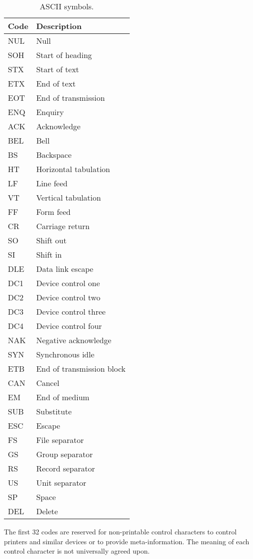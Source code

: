 \documentclass[fsharpnotes.tex]{subfiles}
\begin{document}
\begin{table}
  \centering
  \begin{tabular}{|l|l|}
    \hline
    \rowcolor{headerRowColor} Code & Description\\
    \hline
    NUL & Null\\
    SOH & Start of heading\\
    STX & Start of text\\
    ETX & End of text\\
    EOT & End of transmission\\
    ENQ & Enquiry\\
    ACK & Acknowledge\\
    BEL & Bell\\
    BS & Backspace\\
    HT & Horizontal tabulation\\
    LF & Line feed\\
    VT & Vertical tabulation\\
    FF & Form feed\\
    CR & Carriage return\\
    SO & Shift out\\
    SI & Shift in\\
    DLE & Data link escape\\
    DC1 & Device control one\\
    DC2 & Device control two\\
    DC3 & Device control three\\
    DC4 & Device control four\\
    NAK & Negative acknowledge\\
    SYN & Synchronous idle\\
    ETB & End of transmission block\\
    CAN & Cancel\\
    EM & End of medium\\
    SUB & Substitute\\
    ESC & Escape\\
    FS & File separator\\
    GS & Group separator\\
    RS & Record separator\\
    US & Unit separator\\
    SP & Space\\
    DEL & Delete\\
    \hline
  \end{tabular}
  \caption{ASCII symbols.}
  \label{tab:asciiSpecialSymbols}
\end{table}
The first 32 codes are reserved for non-printable control characters to control printers and similar devices or to provide meta-information. The meaning of each control character is not universally agreed upon.
\end{document}
